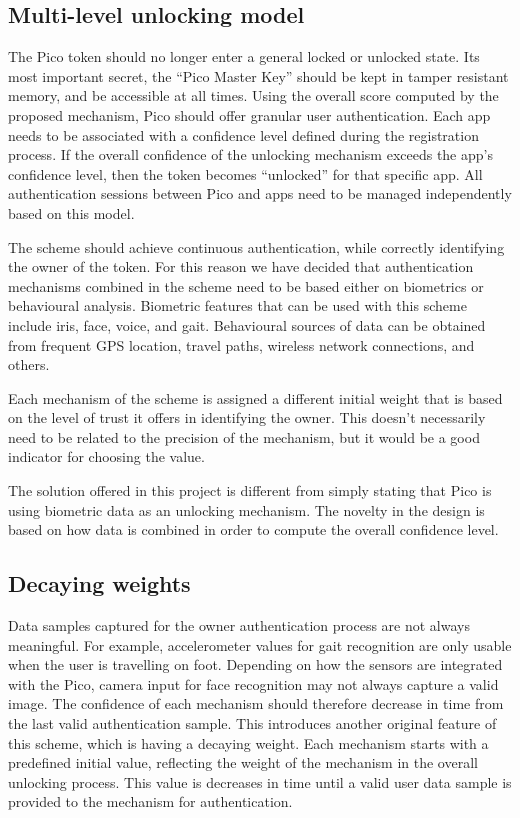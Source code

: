 \subsection*{Multi-level unlocking model}
The Pico token should no longer enter a general locked or unlocked state. Its most important secret, the ``Pico Master Key'' should be kept in tamper resistant memory, and be accessible at all times. Using the overall score computed by the proposed mechanism, Pico should offer granular user authentication. Each app needs to be associated with a confidence level defined during the registration process. If the overall confidence of the unlocking mechanism exceeds the app's confidence level, then the token becomes ``unlocked'' for that specific app. All authentication sessions between Pico and apps need to be managed independently based on this model.

The scheme should achieve continuous authentication, while correctly identifying the owner of the token. For this reason we have decided that authentication mechanisms combined in the scheme need to be based either on biometrics or behavioural analysis. Biometric features that can be used with this scheme include iris, face, voice, and gait. Behavioural sources of data can be obtained from frequent GPS location, travel paths, wireless network connections, and others.

Each mechanism of the scheme is assigned a different initial weight that is based on the level of trust it offers in identifying the owner. This doesn't necessarily need to be related to the precision of the mechanism, but it would be a good indicator for choosing the value.

The solution offered in this project is different from simply stating that Pico is using biometric data as an unlocking mechanism. The novelty in the design is based on how data is combined in order to compute the overall confidence level. 

\subsection*{Decaying weights}
Data samples captured for the owner authentication process are not always meaningful. For example, accelerometer values for gait recognition are only usable when the user is travelling on foot. Depending on how the sensors are integrated with the Pico, camera input for face recognition may not always capture a valid image. The confidence of each mechanism should therefore decrease in time from the last valid authentication sample. This introduces another original feature of this scheme, which is having a decaying weight. Each mechanism starts with a predefined initial value, reflecting the weight of the mechanism in the overall unlocking process. This value is decreases in time until a valid user data sample is provided to the mechanism for authentication. 

